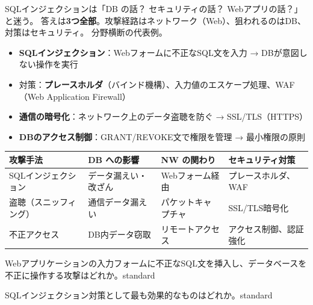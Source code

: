 \begin{stumble}
SQLインジェクションは「DB の話？ セキュリティの話？ Webアプリの話？」と迷う。
答えは\textbf{3つ全部}。攻撃経路はネットワーク（Web）、狙われるのはDB、対策はセキュリティ。
分野横断の代表例。
\end{stumble}

\begin{keypoint}
\begin{itemize}
  \item \textbf{SQLインジェクション}：Webフォームに不正なSQL文を入力 → DBが意図しない操作を実行
  \item 対策：\textbf{プレースホルダ}（バインド機構）、入力値のエスケープ処理、WAF（Web Application Firewall）
  \item \textbf{通信の暗号化}：ネットワーク上のデータ盗聴を防ぐ → SSL/TLS（HTTPS）
  \item \textbf{DBのアクセス制御}：GRANT/REVOKE文で権限を管理 → 最小権限の原則
\end{itemize}
\end{keypoint}

\begin{comparison}
\begin{tabularx}{\textwidth}{lXXX}
  \toprule
  \textbf{攻撃手法} & \textbf{DB への影響} & \textbf{NW の関わり} & \textbf{セキュリティ対策} \\
  \midrule
  SQLインジェクション & データ漏えい・改ざん & Webフォーム経由 & プレースホルダ、WAF \\
  盗聴（スニッフィング） & 通信データ漏えい & パケットキャプチャ & SSL/TLS暗号化 \\
  不正アクセス & DB内データ窃取 & リモートアクセス & アクセス制御、認証強化 \\
  \bottomrule
\end{tabularx}
\end{comparison}


\begin{mondai}{Webアプリケーションの入力フォームに不正なSQL文を挿入し、データベースを不正に操作する攻撃はどれか。}{standard}
\end{mondai}

\begin{mondai}{SQLインジェクション対策として最も効果的なものはどれか。}{standard}
\end{mondai}

